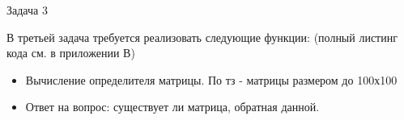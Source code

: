 \begin{large}
	Задача 3\\
\end{large}
В третьей задача требуется реализовать следующие функции: (полный листинг кода см. в приложении В)
\begin{itemize}
	\item Вычисление определителя матрицы. По тз - матрицы размером до 100х100
	\item Ответ на вопрос: существует ли матрица, обратная данной.
\end{itemize}


